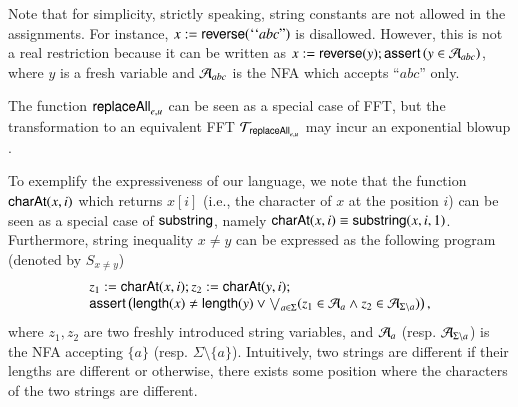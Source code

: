 \begin{remark}
Note that %
for simplicity, strictly speaking, string constants are not allowed in the assignments. %
For instance, %
$x:=\mathsf{reverse}({\mbox``}abc\mbox{''})$ is disallowed. However, this is not a real restriction because it can be written as $x:=\mathsf{reverse}(y); \textsf{assert}\left(y \in \mathcal{A}_{abc}\right)$, where $y$ is a fresh variable and $\mathcal{A}_{abc}$ is the NFA which accepts ``$abc$''  only.
\end{remark}


\begin{remark}
The function $\mathsf{replaceAll}_{e,u}$ can be seen as a special case of FFT, but the transformation to an equivalent FFT $\mathcal{T}_{\mathsf{replaceAll}_{e,u}}$ may incur an exponential blowup \cite{CCH+18}.
\end{remark}

To exemplify the expressiveness of our language, we note that the function $\mathsf{charAt}(x, i)$ which returns $x[i]$ (i.e., the character of $x$ at the position $i$) can be seen as a special case of $\mathsf{substring}$, namely $\mathsf{charAt}(x, i) \equiv \mathsf{substring}(x, i, 1)$. Furthermore, string inequality $x \neq y$ can be expressed as the following {\slint} program (denoted by $S_{x \neq y}$)
\[
\begin{array}{l}
z_1:=\mathsf{charAt}(x,i); z_2 := \mathsf{charAt}(y,i); \\
\textsf{assert}\left(\mathsf{length}(x) \neq \mathsf{length}(y) \vee \bigvee_{a \in \Sigma} (z_1 \in \mathcal{A}_a \wedge z_2 \in \mathcal{A}_{\Sigma \setminus a})\right),
\end{array}
\] 
where $z_1,z_2$ are two freshly introduced string variables, and $\mathcal{A}_a$ (resp. $\mathcal{A}_{\Sigma \setminus a}$) is the NFA accepting $\{a\}$ (resp. $\Sigma \setminus \{a\}$). Intuitively, two strings are different if their lengths are different or otherwise, there exists some position where the characters of the two strings are different.
 




